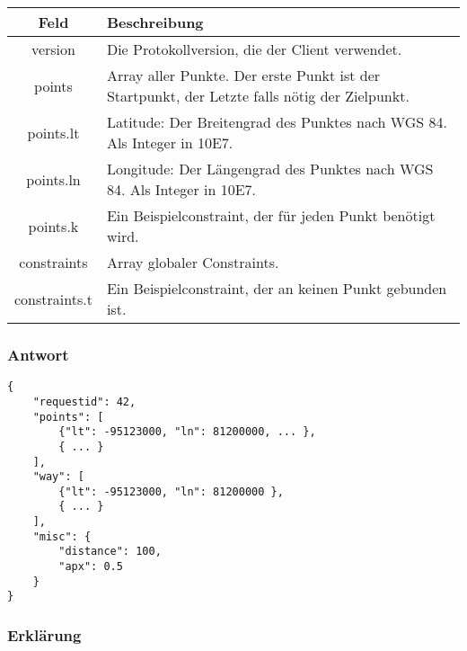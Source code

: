 \documentclass[ngerman,titlepage,parskip=true]{scrartcl}
\begin{document}
	    \noindent \begin{tabular}{|c|p{12cm}|}
	    	\hline
	    	\textbf{Feld} & \textbf{Beschreibung} \\ 
	    	\hline \hline
	    	
	    	version & Die Protokollversion, die der Client verwendet.\\
	    	\hline
	    	
	    	points & Array aller Punkte. Der erste Punkt ist der Startpunkt, der Letzte falls nötig der Zielpunkt. \\ 
	    	\hline
	    	
	    	points.lt & Latitude: Der Breitengrad des Punktes nach WGS 84. Als Integer in 10E7. \\ 
	    	\hline
	    	
	    	points.ln & Longitude: Der Längengrad des Punktes nach WGS 84. Als Integer in 10E7. \\
	    	\hline
	    	
	    	points.k & Ein Beispielconstraint, der für jeden Punkt benötigt wird.\\ 
	    	\hline
	    	
	    	constraints & Array globaler Constraints.\\ 
	    	\hline
	    	
	    	constraints.t & Ein Beispielconstraint, der an keinen Punkt gebunden ist.\\ 
	    	\hline
	    \end{tabular}
    
    \subsubsection{Antwort}	
	\begin{lstlisting}
{
	"requestid": 42,
	"points": [
		{"lt": -95123000, "ln": 81200000, ... },
		{ ... }
	],
	"way": [
		{"lt": -95123000, "ln": 81200000 },
		{ ... }
	],
	"misc": {
		"distance": 100,
		"apx": 0.5
	}
}
	\end{lstlisting}
	
		\subsubsection*{Erklärung}
		
\end{document}
